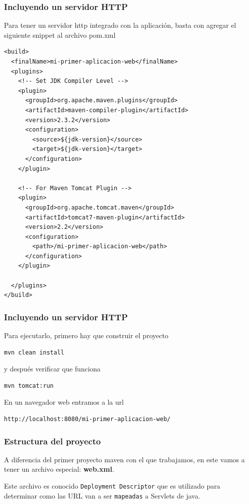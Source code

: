 \documentclass{beamer}
\begin{document}
\begin{frame}[fragile]
  \frametitle{Incluyendo un servidor HTTP}
  Para tener un servidor http integrado con la aplicación, basta con agregar el
  siguiente snippet al archivo pom.xml

  \begin{verbatim}
<build>
  <finalName>mi-primer-aplicacion-web</finalName>
  <plugins>
	<!-- Set JDK Compiler Level -->
	<plugin>
	  <groupId>org.apache.maven.plugins</groupId>
	  <artifactId>maven-compiler-plugin</artifactId>
	  <version>2.3.2</version>
	  <configuration>
		<source>${jdk-version}</source>
		<target>${jdk-version}</target>
	  </configuration>
	</plugin>

	<!-- For Maven Tomcat Plugin -->
	<plugin>
	  <groupId>org.apache.tomcat.maven</groupId>
	  <artifactId>tomcat7-maven-plugin</artifactId>
	  <version>2.2</version>
	  <configuration>
		<path>/mi-primer-aplicacion-web</path>
	  </configuration>
	</plugin>

  </plugins>
</build>
  \end{verbatim}

\end{frame}

\begin{frame}[fragile]
  \frametitle{Incluyendo un servidor HTTP}
  Para ejecutarlo, primero hay que construir el proyecto

\begin{verbatim}
mvn clean install
\end{verbatim}

y después verificar que funciona

\begin{verbatim}
mvn tomcat:run
\end{verbatim}

En un navegador web entramos a la url

\begin{verbatim}
http://localhost:8080/mi-primer-aplicacion-web/
\end{verbatim}

\end{frame}

\begin{frame}
  \frametitle{Estructura del proyecto}
  A diferencia del primer proyecto maven con el que trabajamos, en este vamos a
  tener un archivo especial: \textbf{web.xml}.

  Este archivo es conocido \texttt{Deployment Descriptor} que es utilizado para determinar
  como las URL van a ser \texttt{mapeadas} a Servlets de java.
\end{frame}
\end{document}
